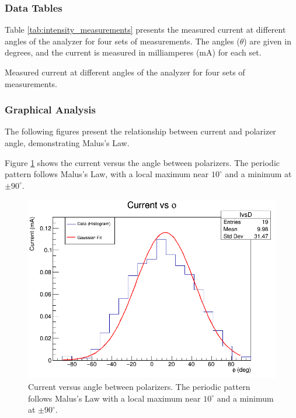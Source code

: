 \documentclass[journal]{IEEEtran}
\begin{document}
\subsubsection{Data Tables}
Table \ref{tab:intensity_measurements} presents the measured current at different angles of the analyzer for four sets of measurements. The angles ($\theta$) are given in degrees, and the current is measured in milliamperes (mA) for each set.

\begin{table}[H]
    \centering
    \caption{Measured current at different angles of the analyzer for four sets of measurements.}
    \label{tab:intensity_measurements}
\end{table}

\subsubsection{Graphical Analysis}
The following figures present the relationship between current and polarizer angle, demonstrating Malus's Law.

Figure \ref{fig:current_vs_angle} shows the current versus the angle between polarizers. The periodic pattern follows Malus's Law, with a local maximum near $10^\circ$ and a minimum at $\pm 90^\circ$.

\begin{figure}[H]
    \centering
    \includegraphics[width=\linewidth]{../plots/I_vs_D.png}
    \caption{Current versus angle between polarizers. The periodic pattern follows Malus's Law with a local maximum near $10^\circ$ and a minimum at $\pm 90^\circ$.}
    \label{fig:current_vs_angle}
\end{figure}
\end{document}
